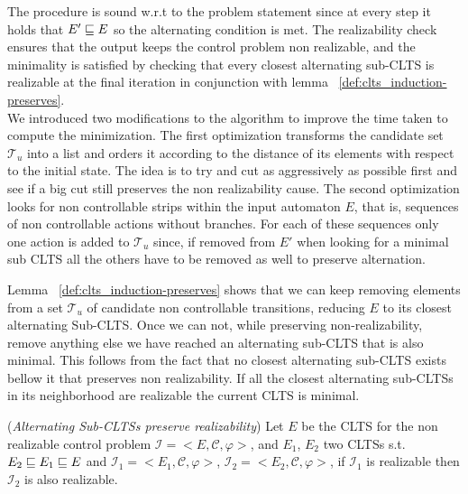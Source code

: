 The procedure is sound w.r.t to the problem statement since 
at every step it holds that $E' \sqsubseteq E$ so the alternating condition
is met.  The realizability check ensures that the output keeps the
control problem non realizable, and the minimality is satisfied by
checking that every closest alternating sub-CLTS is realizable at the
final iteration in conjunction with lemma  ~\ref{def:clts_induction-preserves}.\\

We introduced two modifications to the algorithm
to improve the time taken to compute the minimization.
The first optimization transforms the candidate set $\mathcal{T}_u$
into a list and orders it according to the distance of its elements 
with respect to the initial state.  The idea is to try and cut
as aggressively as possible first and see if a big cut still
preserves the non realizability cause.  The second optimization
looks for non controllable strips within the  input automaton
$E$, that is, sequences of non controllable actions without branches.
For each of these sequences only one action is
added to $\mathcal{T}_u$ since, if removed from $E'$
when looking for a minimal sub CLTS all the others have to be removed
as well to preserve alternation.

Lemma ~\ref{def:clts_induction-preserves} shows that we can keep removing
elements from a set $\mathcal{T}_u$ of candidate non controllable
transitions, reducing $E$ to its closest alternating Sub-CLTS.
Once we can not,
while preserving non-realizability, remove
anything else we have reached an alternating sub-CLTS that is also minimal.
This follows from the fact that
no closest alternating sub-CLTS exists bellow it that preserves non realizability.
If all the closest alternating sub-CLTSs in its neighborhood 
are realizable the current CLTS is minimal.


\begin{lemma}\label{def:clts_induction-preserves}(\emph{Alternating Sub-CLTSs preserve realizability})
	Let $E$ be the CLTS for the non realizable control problem
	$\mathcal{I}=<E,\mathcal{C}, \varphi>$, and $E_1$, $E_2$ two CLTSs s.t. 
	$E_2 \sqsubseteq E_1 \sqsubseteq E$ and
	$\mathcal{I}_1=<E_1, \mathcal{C}, \varphi>$, $\mathcal{I}_2=<E_2, \mathcal{C}, \varphi>$, if $\mathcal{I}_1$ is realizable then $\mathcal{I}_2$ is also realizable.
\end{lemma}


